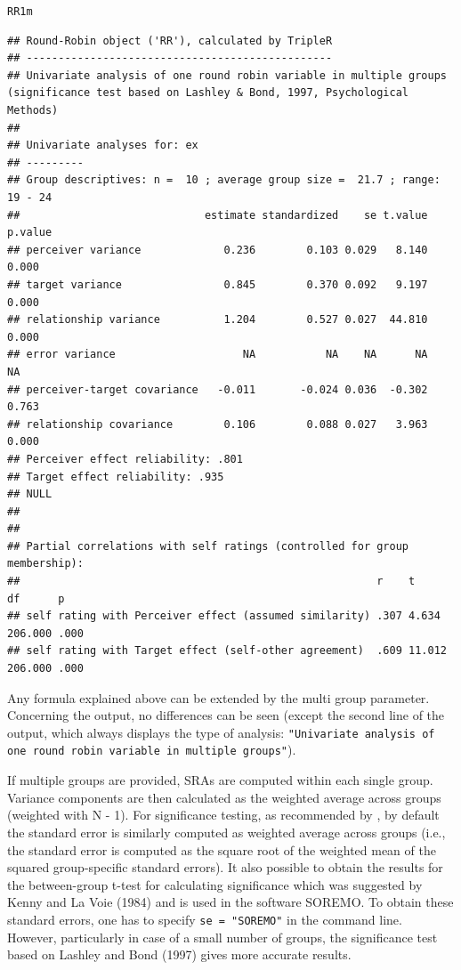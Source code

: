 \documentclass[a4paper]{article}\usepackage[]{graphicx}\usepackage[]{color}
\makeatletter
\newcommand{\hlstd}[1]{\textcolor[rgb]{0.345,0.345,0.345}{#1}}%
\newenvironment{kframe}{%
 \def\at@end@of@kframe{}%
 \ifinner\ifhmode%
  \def\at@end@of@kframe{\end{minipage}}%
  \begin{minipage}{\columnwidth}%
 \fi\fi%
 \def\FrameCommand##1{\hskip\@totalleftmargin \hskip-\fboxsep
 \colorbox{shadecolor}{##1}\hskip-\fboxsep
     \hskip-\linewidth \hskip-\@totalleftmargin \hskip\columnwidth}%
 \MakeFramed {\advance\hsize-\width
   \@totalleftmargin\z@ \linewidth\hsize
   \@setminipage}}%
 {\par\unskip\endMakeFramed%
 \at@end@of@kframe}
\newenvironment{knitrout}{}{} %
\makeatother
\begin{document}
\begin{knitrout}
\begin{kframe}
{\ttfamily\noindent\color{warningcolor}{\#\# Warning: ex : \ 4 \ participant(s) have been excluded from group 20 due to exceedingly missing data; id(s) = 92002, 92009, 92013, 92019 .}}\begin{alltt}
\hlstd{RR1m}
\end{alltt}
\begin{verbatim}
## Round-Robin object ('RR'), calculated by TripleR
## ------------------------------------------------
## Univariate analysis of one round robin variable in multiple groups (significance test based on Lashley & Bond, 1997, Psychological Methods)
## 
## Univariate analyses for: ex 
## ---------
## Group descriptives: n =  10 ; average group size =  21.7 ; range:  19 - 24 
##                             estimate standardized    se t.value p.value
## perceiver variance             0.236        0.103 0.029   8.140   0.000
## target variance                0.845        0.370 0.092   9.197   0.000
## relationship variance          1.204        0.527 0.027  44.810   0.000
## error variance                    NA           NA    NA      NA      NA
## perceiver-target covariance   -0.011       -0.024 0.036  -0.302   0.763
## relationship covariance        0.106        0.088 0.027   3.963   0.000
## Perceiver effect reliability: .801 
## Target effect reliability: .935 
## NULL
## 
## 
## Partial correlations with self ratings (controlled for group membership):
##                                                        r    t      df      p   
## self rating with Perceiver effect (assumed similarity) .307 4.634  206.000 .000
## self rating with Target effect (self-other agreement)  .609 11.012 206.000 .000
\end{verbatim}
\end{kframe}
\end{knitrout}


Any formula explained above can be extended by the multi group parameter. Concerning the output, no differences can be seen (except the second line of the output, which always displays the type of analysis: \texttt{"Univariate analysis of one round robin variable in multiple groups"}). 

If multiple groups are provided, SRAs are computed within each single group. Variance components are then calculated as the weighted average across groups (weighted with N - 1). For significance testing, as recommended by , by default the standard error is similarly computed as weighted average across groups (i.e., the standard error is computed as the square root of the weighted mean of the squared group-specific standard errors). It also possible to obtain the results for the between-group t-test for calculating significance which was suggested by Kenny and La Voie (1984) and is used in the software SOREMO. To obtain these standard errors, one has to specify \texttt{se = "SOREMO"} in the command line. However, particularly in case of a small number of groups, the significance test based on Lashley and Bond (1997) gives more accurate results.
\end{document}

